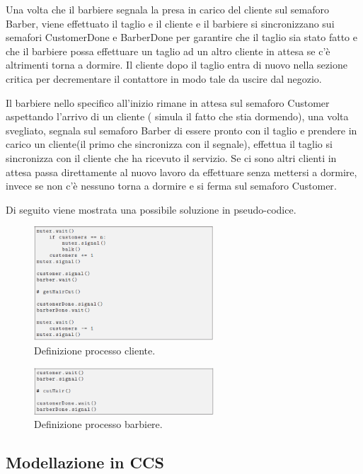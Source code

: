Una volta che il barbiere segnala la presa in carico del cliente sul semaforo \textsf{Barber}, viene effettuato il taglio e il cliente e il barbiere si sincronizzano sui semafori \textsf{CustomerDone} e \textsf{BarberDone} per garantire che il taglio sia stato fatto e che il barbiere possa effettuare un taglio ad un altro cliente in attesa se c'è altrimenti torna a dormire. Il cliente dopo il taglio entra di nuovo nella sezione critica per decrementare il contattore in modo tale da uscire dal negozio.

Il barbiere nello specifico all'inizio rimane in attesa sul semaforo \textsf{Customer} aspettando l'arrivo di un cliente ( simula il fatto che stia dormendo), una volta svegliato, segnala sul semaforo \textsf{Barber} di essere pronto con il taglio e prendere in carico un cliente(il primo che sincronizza con il segnale), effettua il taglio si sincronizza con il cliente che ha ricevuto il servizio. Se ci sono altri clienti in attesa passa direttamente al nuovo lavoro da effettuare senza mettersi a dormire, invece se non c'è nessuno torna a dormire e si ferma sul semaforo \textsf{Customer}.

\pagebreak
Di seguito viene mostrata una possibile soluzione in pseudo-codice.


\begin{figure}[h]
	\centering
	\includegraphics[width=0.6\textwidth]{Figure/2.png}
	\caption{Definizione processo cliente.}
\end{figure}

\begin{figure}[h]
	\centering
	\includegraphics[width=0.6\textwidth]{Figure/3.png}
	\caption{Definizione processo barbiere.}
\end{figure}
\subsection{Modellazione in CCS}

